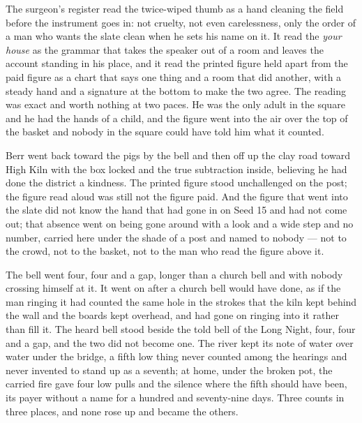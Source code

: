 The surgeon's register read the twice-wiped thumb as a hand cleaning the field before the instrument goes in: not cruelty, not even carelessness, only the order of a man who wants the slate clean when he sets his name on it. It read the \emph{your house} as the grammar that takes the speaker out of a room and leaves the account standing in his place, and it read the printed figure held apart from the paid figure as a chart that says one thing and a room that did another, with a steady hand and a signature at the bottom to make the two agree. The reading was exact and worth nothing at two paces. He was the only adult in the square and he had the hands of a child, and the figure went into the air over the top of the basket and nobody in the square could have told him what it counted.

Berr went back toward the pigs by the bell and then off up the clay road toward High Kiln with the box locked and the true subtraction inside, believing he had done the district a kindness. The printed figure stood unchallenged on the post; the figure read aloud was still not the figure paid. And the figure that went into the slate did not know the hand that had gone in on Seed 15 and had not come out; that absence went on being gone around with a look and a wide step and no number, carried here under the shade of a post and named to nobody --- not to the crowd, not to the basket, not to the man who read the figure above it.

The bell went four, four and a gap, longer than a church bell and with nobody crossing himself at it. It went on after a church bell would have done, as if the man ringing it had counted the same hole in the strokes that the kiln kept behind the wall and the boards kept overhead, and had gone on ringing into it rather than fill it. The heard bell stood beside the told bell of the Long Night, four, four and a gap, and the two did not become one. The river kept its note of water over water under the bridge, a fifth low thing never counted among the hearings and never invented to stand up as a seventh; at home, under the broken pot, the carried fire gave four low pulls and the silence where the fifth should have been, its payer without a name for a hundred and seventy-nine days. Three counts in three places, and none rose up and became the others.

\scenebreak

